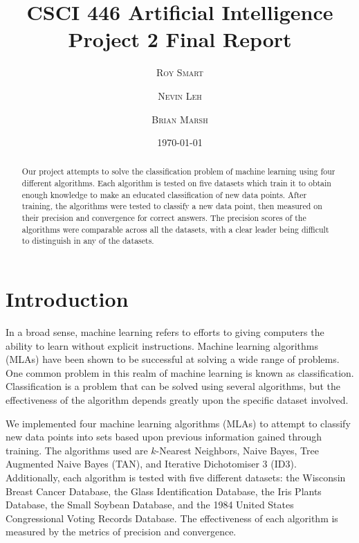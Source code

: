 \documentclass{article}
\title{\vspace{-15mm}\fontsize{24pt}{10pt}\selectfont\textbf{CSCI 446 Artificial Intelligence \\ Project 2 Final Report} \\[-2mm]} %
\date{\today}
\author{
\large
\textsc{Roy Smart} \and \textsc{Nevin Leh} \and \textsc{Brian Marsh}\\[2mm] %
}
\begin{document}
\maketitle %

\thispagestyle{fancy} %



\normalsize

\begin{abstract}

	Our project attempts to solve the classification problem of machine learning using four different algorithms.  
	Each algorithm is tested on five datasets which train it to obtain enough knowledge to make an educated classification of new data points.  
	After training, the algorithms were tested to classify a new data point, then measured on their precision and convergence for correct answers.  
	The precision scores of the algorithms were comparable across all the datasets, with a clear leader being difficult to distinguish in any of the datasets.
	
\end{abstract}
\section{Introduction}

	In a broad sense, machine learning refers to efforts to giving computers the ability to learn without explicit instructions. 
	Machine learning algorithms (MLAs) have been shown to be successful at solving a wide range of problems.  
	One common problem in this realm of machine learning is known as classification. 
	Classification is a problem that can be solved using several algorithms, but the effectiveness of the algorithm depends greatly upon the specific dataset involved.
	  
	We implemented four machine learning algorithms (MLAs) to attempt to classify new data points into sets based upon previous information gained through training.  
	The algorithms used are $k$-Nearest Neighbors, Naive Bayes, Tree Augmented Naive Bayes (TAN), and Iterative Dichotomiser 3 (ID3).  
	Additionally, each algorithm is tested with five different datasets: the Wisconsin Breast Cancer Database, the Glass Identification Database, the Iris Plants Database, the Small Soybean Database, and the 1984 United States Congressional Voting Records Database.  
	The effectiveness of each algorithm is measured by the metrics of precision and convergence.  
\end{document}
